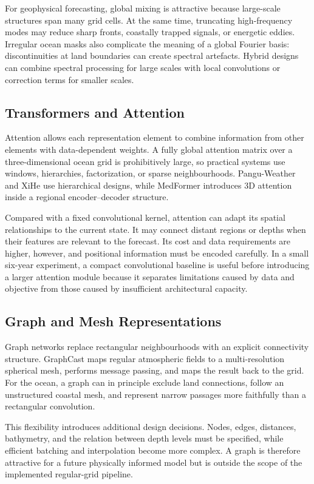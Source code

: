 For geophysical forecasting, global mixing is attractive because large-scale structures span many grid cells. At the same time, truncating high-frequency modes may reduce sharp fronts, coastally trapped signals, or energetic eddies. Irregular ocean masks also complicate the meaning of a global Fourier basis: discontinuities at land boundaries can create spectral artefacts. Hybrid designs can combine spectral processing for large scales with local convolutions or correction terms for smaller scales.

\subsection{Transformers and Attention}

Attention allows each representation element to combine information from other elements with data-dependent weights. A fully global attention matrix over a three-dimensional ocean grid is prohibitively large, so practical systems use windows, hierarchies, factorization, or sparse neighbourhoods. Pangu-Weather and XiHe use hierarchical designs, while MedFormer introduces 3D attention inside a regional encoder--decoder structure.

Compared with a fixed convolutional kernel, attention can adapt its spatial relationships to the current state. It may connect distant regions or depths when their features are relevant to the forecast. Its cost and data requirements are higher, however, and positional information must be encoded carefully. In a small six-year experiment, a compact convolutional baseline is useful before introducing a larger attention module because it separates limitations caused by data and objective from those caused by insufficient architectural capacity.

\subsection{Graph and Mesh Representations}

Graph networks replace rectangular neighbourhoods with an explicit connectivity structure. GraphCast maps regular atmospheric fields to a multi-resolution spherical mesh, performs message passing, and maps the result back to the grid. For the ocean, a graph can in principle exclude land connections, follow an unstructured coastal mesh, and represent narrow passages more faithfully than a rectangular convolution.

This flexibility introduces additional design decisions. Nodes, edges, distances, bathymetry, and the relation between depth levels must be specified, while efficient batching and interpolation become more complex. A graph is therefore attractive for a future physically informed model but is outside the scope of the implemented regular-grid pipeline.

